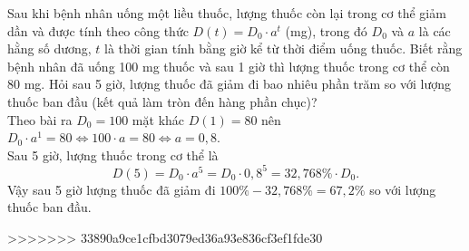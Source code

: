 \begin{ex}%
	Sau khi bệnh nhân uống một liều thuốc, lượng thuốc còn lại trong cơ thể giảm dần và được tính theo công thức $D(t)=D_0\cdot a^t$ (mg), trong đó $D_0$ và $a$ là các hằng số dương, $t$ là thời gian tính bằng giờ kể từ thời điểm uống thuốc. Biết rằng bệnh nhân đã uống 100 mg thuốc và sau 1 giờ thì lượng thuốc trong cơ thể còn 80 mg. Hỏi sau 5 giờ, lượng thuốc đã giảm đi bao nhiêu phần trăm so với lượng thuốc ban đầu (kết quả làm tròn đến hàng phần chục)?\\
	\loigiai
	{Theo bài ra $D_0=100$ mặt khác $D(1)=80$ nên $D_0\cdot a^1=80\Leftrightarrow 100\cdot a=80\Leftrightarrow a=0{,}8$.\\
		Sau 5 giờ, lượng thuốc trong cơ thể là 
		\[D(5)=D_0\cdot a^5=D_0\cdot 0{,}8^5=32{,}768\%\cdot D_0.\]
		Vậy sau 5 giờ lượng thuốc đã giảm đi $100\%-32{,}768\%=67{,}2\%$ so với lượng thuốc ban đầu. 
	}
\end{ex}

>>>>>>> 33890a9ce1cfbd3079ed36a93e836cf3ef1fde30
